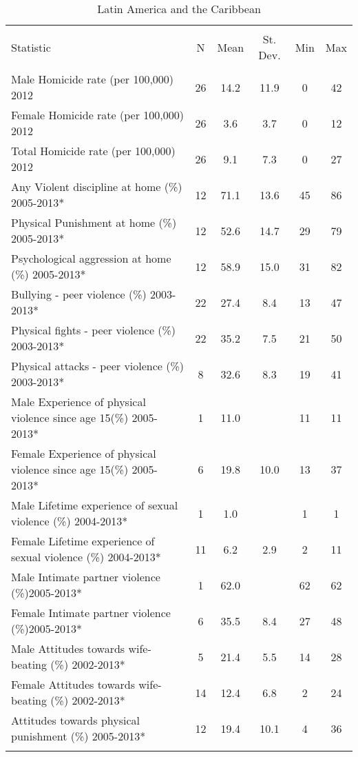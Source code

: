 
\begin{table}[!htbp] \centering 
  \caption{Latin America and the Caribbean} 
  \label{} 
\begin{tabular}{@{\extracolsep{5pt}}lccccc} 
\\[-1.8ex]\hline 
\hline \\[-1.8ex] 
Statistic & \multicolumn{1}{c}{N} & \multicolumn{1}{c}{Mean} & \multicolumn{1}{c}{St. Dev.} & \multicolumn{1}{c}{Min} & \multicolumn{1}{c}{Max} \\ 
\hline \\[-1.8ex] 
Male Homicide rate (per 100,000) 2012 & 26 & 14.2 & 11.9 & 0 & 42 \\ 
Female Homicide rate (per 100,000)  2012 & 26 & 3.6 & 3.7 & 0 & 12 \\ 
Total Homicide rate (per 100,000)  2012 & 26 & 9.1 & 7.3 & 0 & 27 \\ 
Any Violent discipline at home (\%) 2005-2013* & 12 & 71.1 & 13.6 & 45 & 86 \\ 
Physical Punishment at home (\%) 2005-2013* & 12 & 52.6 & 14.7 & 29 & 79 \\ 
Psychological aggression at home (\%) 2005-2013* & 12 & 58.9 & 15.0 & 31 & 82 \\ 
Bullying - peer violence (\%) 2003-2013* & 22 & 27.4 & 8.4 & 13 & 47 \\ 
Physical fights - peer violence (\%) 2003-2013* & 22 & 35.2 & 7.5 & 21 & 50 \\ 
Physical attacks - peer violence (\%) 2003-2013* & 8 & 32.6 & 8.3 & 19 & 41 \\ 
Male Experience of physical violence since age 15(\%) 2005-2013* & 1 & 11.0 &  & 11 & 11 \\ 
Female Experience of physical violence since age 15(\%) 2005-2013* & 6 & 19.8 & 10.0 & 13 & 37 \\ 
Male Lifetime experience of sexual violence (\%) 2004-2013* & 1 & 1.0 &  & 1 & 1 \\ 
Female Lifetime experience of sexual violence (\%) 2004-2013* & 11 & 6.2 & 2.9 & 2 & 11 \\ 
Male Intimate partner violence (\%)2005-2013* & 1 & 62.0 &  & 62 & 62 \\ 
Female Intimate partner violence (\%)2005-2013* & 6 & 35.5 & 8.4 & 27 & 48 \\ 
Male Attitudes towards wife-beating (\%) 2002-2013* & 5 & 21.4 & 5.5 & 14 & 28 \\ 
Female Attitudes towards wife-beating (\%) 2002-2013* & 14 & 12.4 & 6.8 & 2 & 24 \\ 
Attitudes towards physical punishment (\%) 2005-2013* & 12 & 19.4 & 10.1 & 4 & 36 \\ 
\hline \\[-1.8ex] 
\end{tabular} 
\end{table} 
